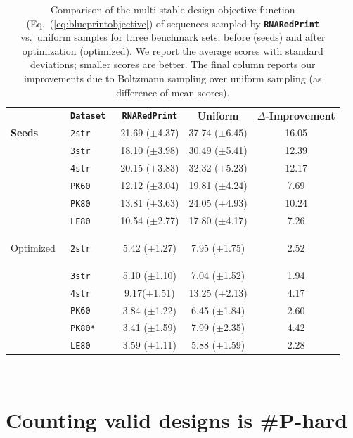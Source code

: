 \documentclass{bioinfo}
\newcommand{\ourprog}{{\tt \bfseries{}\color{black!75}RNA\textcolor{red!70!black}{Red}Print}}
\begin{document}
\begin{table}[t]
\centering
\medskip
\begin{tabular}{@{}>{\bf}l@{\quad}>{\tt}l@{\quad}@{\quad}c@{\quad}c@{\quad}c@{}}
  &   \textbf{\textrm{Dataset}}   & {\bfseries\ourprog{}} & \textbf{Uniform} & \textbf{$\Delta$-Improvement}\\
  Seeds      & 2str & 21.69 ($\pm$4.37) & 37.74 ($\pm$6.45) & 16.05\\
             & 3str & 18.10 ($\pm$3.98) & 30.49 ($\pm$5.41) & 12.39\\
             & 4str & 20.15 ($\pm$3.83) & 32.32 ($\pm$5.23) & 12.17\\
             \cline{2-5}
             & PK60 & 12.12 ($\pm$3.04) & 19.81 ($\pm$4.24) & 7.69\\
             & PK80 & 13.81 ($\pm$3.63) & 24.05 ($\pm$4.93) & 10.24\\
             & LE80 & 10.54 ($\pm$2.77) & 17.80 ($\pm$4.17) & 7.26\\
             \midrule

  Optimized  & 2str & 5.42 ($\pm$1.27) & 7.95 ($\pm$1.75) & 2.52\\
             & 3str & 5.10 ($\pm$1.10) & 7.04 ($\pm$1.52) & 1.94\\
             & 4str & 9.17($\pm$1.51) & 13.25 ($\pm$2.13) & 4.17\\
             \cline{2-5}
             & PK60  & 3.84 ($\pm$1.22) & 6.45 ($\pm$1.84) & 2.60\\
             & PK80* & 3.41 ($\pm$1.59) & 7.99 ($\pm$2.35) & 4.42\\
             & LE80  & 3.59 ($\pm$1.11) & 5.88 ($\pm$1.59) & 2.28\\
             \bottomrule
\end{tabular}\\[1em]

\caption{Comparison of the multi-stable design objective function
  (Eq.~(\ref{eq:blueprintobjective}) of sequences sampled by
  \ourprog{} vs.\ uniform samples for three benchmark sets; before
  (seeds) and after optimization (optimized). We report the average
  scores with standard deviations; smaller scores are better. The
  final column reports our improvements due to Boltzmann sampling over
  uniform sampling (as difference of mean scores).}
\label{tab:benchmark-results}
\end{table}

\section{Counting valid designs is \#{\sf P}-hard}\label{sec:counting}
\end{document}

